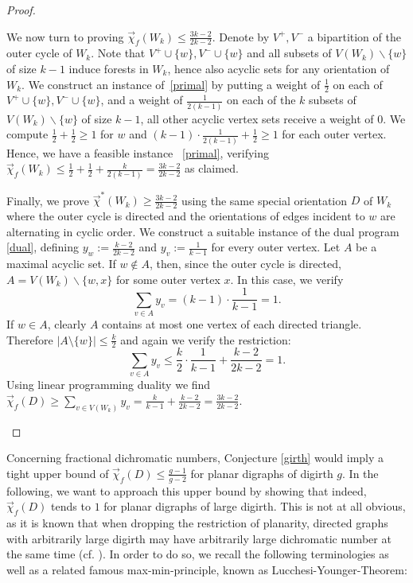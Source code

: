 \documentclass[fontsize=11pt,a4paper,DIV12]{scrartcl}
\theoremstyle{meiner}
\theoremstyle{definition}
\begin{document}
\begin{proof}
\begin{itemize}
  We now turn to  proving $\vec{\chi}_f(W_k) \leq
  \frac{3k-2}{2k-2}$. 
  Denote by $V^+,V^-$ a bipartition of the outer cycle of $W_k$. Note
  that $V^+ \cup \{w\}, V^-\cup\{w\}$ and all subsets of $V(W_k)
  \backslash \{w\}$ of size $k-1$ induce forests in $W_k$, hence also
  acyclic sets for any orientation of $W_k$.  We construct an instance
  of~\eqref{primal} by putting a weight of $\frac{1}{2}$ on each of
  $V^+ \cup \{w\}, V^- \cup \{w\}$, and a weight of $\frac{1}{2(k-1)}$
  on each of the $k$ subsets of $V(W_k) \backslash \{w\}$ of size
  $k-1$, all  other acyclic vertex sets receive a weight of $0$.
  We compute $\frac{1}{2}+\frac{1}{2} \geq 1$ for $w$ and $(k-1)
  \cdot \frac{1}{2(k-1)}+\frac{1}{2} \geq 1$ for each outer vertex.
  Hence, we have a feasible instance ~\eqref{primal}, verifying
  $\vec{\chi}_f(W_k) \leq \frac{1}{2}+\frac{1}{2}+
  \frac{k}{2(k-1)}=\frac{3k-2}{2k-2}$ as
  claimed. 

  Finally, we prove $\vec{\chi}^\ast(W_k) \ge \frac{3k-2}{2k-2}$ using
  the same special orientation $D$ of $W_k$ where the outer cycle is
  directed and the orientations of edges incident to $w$ are
  alternating in cyclic order. We construct a suitable instance of the
  dual program \eqref{dual}, defining $y_w:=\frac{k-2}{2k-2}$ and
  $y_v:=\frac{1}{k-1}$ for every outer vertex.  Let $A$ be a maximal
  acyclic set. If $w \notin A$, then, since the
  outer cycle is directed, $A=V(W_k) \backslash \{w,x\}$ for some
  outer vertex $x$. In this case, we verify
$$\sum_{v \in A}{y_v}=(k-1)\cdot\frac{1}{k-1}=1.$$
If $w \in A$, clearly $A$ contains at most one vertex of each directed triangle. Therefore \mbox{$|A \setminus \{w\}| \leq \frac{k}{2}$} and again we verify the restriction:
$$\sum_{v \in A}{y_v} \leq \frac{k}{2} \cdot \frac{1}{k-1}+\frac{k-2}{2k-2}=1.$$
Using linear programming duality we find $\vec{\chi}_f(D) \ge \sum_{v
  \in
  V(W_k)}{y_v}=\frac{k}{k-1}+\frac{k-2}{2k-2}=\frac{3k-2}{2k-2}$.
\end{itemize}
\end{proof}
Concerning fractional dichromatic numbers, Conjecture \ref{girth} would imply a tight upper bound of $\vec{\chi}_f(D) \leq \frac{g-1}{g-2}$ for planar digraphs of digirth $g$. In the following, we want to approach this upper bound by showing that indeed, $\vec{\chi}_f(D)$ tends to $1$ for planar digraphs of large digirth. This is not at all obvious, as it is known that when dropping the restriction of planarity, directed graphs with arbitrarily large digirth may have arbitrarily large dichromatic number at the same time (cf. \cite{twores}). In order to do so, we recall the following terminologies as well as a related famous max-min-principle, known as Lucchesi-Younger-Theorem:
\end{document}
